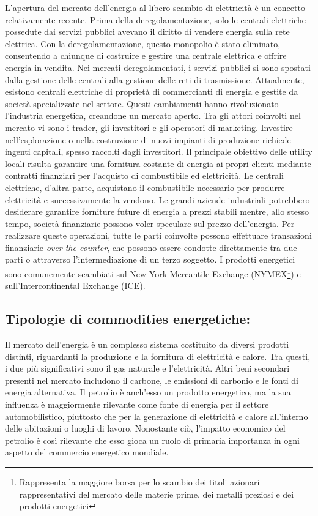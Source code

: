 \documentclass[12pt,a4paper]{report}
\begin{document}
L'apertura del mercato dell'energia al libero scambio di elettricità è un concetto relativamente recente. Prima della deregolamentazione, solo le centrali elettriche possedute dai servizi pubblici avevano il diritto di vendere energia sulla rete elettrica. Con la deregolamentazione, questo monopolio è stato eliminato, consentendo a chiunque di costruire e gestire una centrale elettrica e offrire energia in vendita. Nei mercati deregolamentati, i servizi pubblici si sono spostati dalla gestione delle centrali alla gestione delle reti di trasmissione. Attualmente, esistono centrali elettriche di proprietà di commercianti di energia e gestite da società specializzate nel settore. Questi cambiamenti hanno rivoluzionato l'industria energetica, creandone un mercato aperto.
Tra gli attori coinvolti nel mercato vi sono i trader, gli investitori e gli operatori di marketing.
Investire nell'esplorazione o nella costruzione di nuovi impianti di produzione richiede ingenti capitali, spesso raccolti dagli investitori. Il principale obiettivo delle utility locali risulta garantire una fornitura costante di energia ai propri clienti mediante contratti finanziari per l'acquisto di combustibile ed elettricità. Le centrali elettriche, d'altra parte, acquistano il combustibile necessario per produrre elettricità e successivamente la vendono. Le grandi aziende industriali potrebbero desiderare garantire forniture future di energia a prezzi stabili mentre, allo stesso tempo, società finanziarie possono voler speculare sul prezzo dell'energia. Per realizzare queste operazioni, tutte le parti coinvolte possono effettuare transazioni finanziarie \textit{over the counter}, che possono essere condotte direttamente tra due parti o attraverso l'intermediazione di un terzo soggetto. I prodotti energetici sono comunemente scambiati sul New York Mercantile Exchange (NYMEX\footnote{Rappresenta la maggiore borsa per lo scambio dei titoli azionari rappresentativi del mercato delle materie prime, dei metalli preziosi e dei prodotti energetici}) e sull'Intercontinental Exchange (ICE).

\subsection{Tipologie di commodities energetiche:}

Il mercato dell'energia è un complesso sistema costituito da diversi prodotti distinti, riguardanti la produzione e la fornitura di elettricità e calore. Tra questi, i due più significativi sono il gas naturale e l'elettricità. Altri beni secondari presenti nel mercato includono il carbone, le emissioni di carbonio e le fonti di energia alternativa. Il petrolio è anch'esso un prodotto energetico, ma la sua influenza è maggiormente rilevante come fonte di energia per il settore automobilistico, piuttosto che per la generazione di elettricità e calore all'interno delle abitazioni o luoghi di lavoro. Nonostante ciò, l'impatto economico del petrolio è così rilevante che esso gioca un ruolo di primaria importanza in ogni aspetto del commercio energetico mondiale. 
\end{document}
